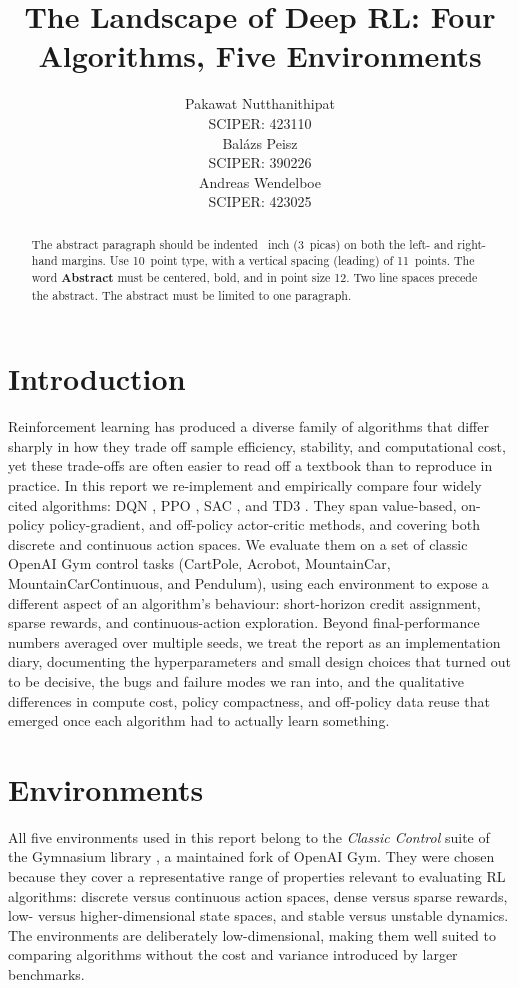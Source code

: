 \documentclass{article}
\title{The Landscape of Deep RL: Four Algorithms, Five Environments}
\author{%
  Pakawat Nutthanithipat \\
  SCIPER: 423110 \\
  \And
  Balázs Peisz \\
  SCIPER: 390226 \\
  \And
  Andreas Wendelboe \\
  SCIPER: 423025 \\
}
\begin{document}
\maketitle


\begin{abstract}
  The abstract paragraph should be indented ~inch (3~picas) on both the left- and right-hand margins. Use 10~point type, with a vertical spacing (leading) of 11~points. The word \textbf{Abstract} must be centered, bold, and in point size 12. Two line spaces precede the abstract. The abstract must be limited to one paragraph.
\end{abstract}



\section{Introduction}

Reinforcement learning has produced a diverse family of algorithms that differ sharply in how they trade off sample efficiency, stability, and computational cost, yet these trade-offs are often easier to read off a textbook than to reproduce in practice. In this report we re-implement and empirically compare four widely cited algorithms: DQN \citep{mnih2013playing}, PPO \citep{schulman2017proximal}, SAC \citep{haarnoja2018soft}, and TD3 \citep{fujimoto2018addressing}. They span value-based, on-policy policy-gradient, and off-policy actor-critic methods, and covering both discrete and continuous action spaces. We evaluate them on a set of classic OpenAI Gym control tasks (CartPole, Acrobot, MountainCar, MountainCarContinuous, and Pendulum), using each environment to expose a different aspect of an algorithm's behaviour: short-horizon credit assignment, sparse rewards, and continuous-action exploration. Beyond final-performance numbers averaged over multiple seeds, we treat the report as an implementation diary, documenting the hyperparameters and small design choices that turned out to be decisive, the bugs and failure modes we ran into, and the qualitative differences in compute cost, policy compactness, and off-policy data reuse that emerged once each algorithm had to actually learn something.


\section{Environments}

All five environments used in this report belong to the \emph{Classic Control} suite of the Gymnasium library \citep{towers2024gymnasium}, a maintained fork of OpenAI Gym. They were chosen because they cover a representative range of properties relevant to evaluating RL algorithms: discrete versus continuous action spaces, dense versus sparse rewards, low- versus higher-dimensional state spaces, and stable versus unstable dynamics. The environments are deliberately low-dimensional, making them well suited to comparing algorithms without the cost and variance introduced by larger benchmarks.
\end{document}
